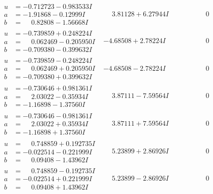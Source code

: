 \documentclass[1p]{elsarticle_modified}
\theoremstyle{definition}
\begin{document}
$$\begin{array}{c|c|c}
\begin{aligned}
u &= -0.712723 - 0.983533 I \\
a &= -1.91868 - 0.12999 I \\
b &= \phantom{-}0.82808 - 1.56668 I\end{aligned}
 & \phantom{-}3.81128 + 6.27944 I & \phantom{-0.000000 } 0 \\ \hline\begin{aligned}
u &= -0.739859 + 0.248224 I \\
a &= \phantom{-}0.062469 - 0.205950 I \\
b &= -0.709380 - 0.399632 I\end{aligned}
 & -4.68508 + 2.78224 I & \phantom{-0.000000 } 0 \\ \hline\begin{aligned}
u &= -0.739859 - 0.248224 I \\
a &= \phantom{-}0.062469 + 0.205950 I \\
b &= -0.709380 + 0.399632 I\end{aligned}
 & -4.68508 - 2.78224 I & \phantom{-0.000000 } 0 \\ \hline\begin{aligned}
u &= -0.730646 + 0.981361 I \\
a &= \phantom{-}2.03022 - 0.35934 I \\
b &= -1.16898 - 1.37560 I\end{aligned}
 & \phantom{-}3.87111 - 7.59564 I & \phantom{-0.000000 } 0 \\ \hline\begin{aligned}
u &= -0.730646 - 0.981361 I \\
a &= \phantom{-}2.03022 + 0.35934 I \\
b &= -1.16898 + 1.37560 I\end{aligned}
 & \phantom{-}3.87111 + 7.59564 I & \phantom{-0.000000 } 0 \\ \hline\begin{aligned}
u &= \phantom{-}0.748859 + 0.192735 I \\
a &= -0.022514 - 0.221999 I \\
b &= \phantom{-}0.09408 - 1.43962 I\end{aligned}
 & \phantom{-}5.23899 + 2.86926 I & \phantom{-0.000000 } 0 \\ \hline\begin{aligned}
u &= \phantom{-}0.748859 - 0.192735 I \\
a &= -0.022514 + 0.221999 I \\
b &= \phantom{-}0.09408 + 1.43962 I\end{aligned}
 & \phantom{-}5.23899 - 2.86926 I & \phantom{-0.000000 } 0 \\ \hline\begin{aligned}

\end{aligned}
\end{array}$$
\end{document}
